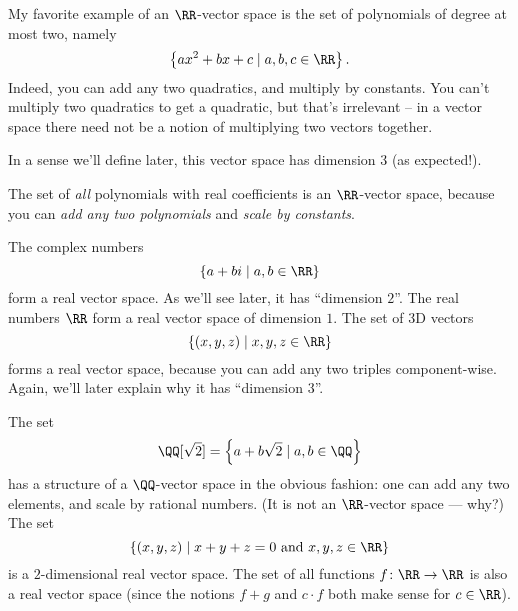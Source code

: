 \begin{example}
	My favorite example of an $\RR$-vector space is the
	set of polynomials of degree at most two, namely
	\[ \left\{ ax^2+bx+c \mid a,b,c \in \RR \right\}. \]
	Indeed, you can add any two quadratics, and multiply by constants.
	You can't multiply two quadratics to get a quadratic,
	but that's irrelevant -- in a vector space there need not
	be a notion of multiplying two vectors together.

	In a sense we'll define later, this vector space
	has dimension $3$ (as expected!).
	\label{example:quadratic_vector_space}
\end{example}
\begin{example}
	The set of \emph{all} polynomials with real coefficients is an
	$\RR$-vector space, because you can \emph{add any two polynomials}
	and \emph{scale by constants}.
\end{example}

\begin{example}
	\listhack
	\begin{enumerate}[(a)]
		\ii The complex numbers
		\[ \left\{ a+bi \mid a,b \in \RR \right\} \]
		form a real vector space. As we'll see later,
		it has ``dimension $2$''.
		\ii The real numbers $\RR$ form a real vector space of dimension $1$.
		\ii The set of 3D vectors
		\[ \left\{ (x,y,z) \mid x,y,z \in \RR \right\} \]
		forms a real vector space, because you can add any two triples
		component-wise. Again, we'll later explain
		why it has ``dimension $3$''.
	\end{enumerate}
\end{example}

\begin{example}
	\listhack
	\begin{enumerate}[(a)]
		\ii The set \[ \QQ[\sqrt 2] = \left\{ a + b \sqrt 2 \mid a, b \in \QQ \right\} \]
		has a structure of a $\QQ$-vector space in the obvious fashion:
		one can add any two elements, and scale by rational numbers.
		(It is not an $\RR$-vector space --- why?)
		\ii The set \[ \left\{ (x,y,z) \mid x+y+z = 0 \text{ and } x,y,z \in \RR \right\} \]
		is a $2$-dimensional real vector space.
		\ii The set of all functions $f \colon \RR \to \RR$ is also a real vector space
		(since the notions $f+g$ and $c \cdot f$ both make sense for $c \in \RR$).
	\end{enumerate}
\end{example}

